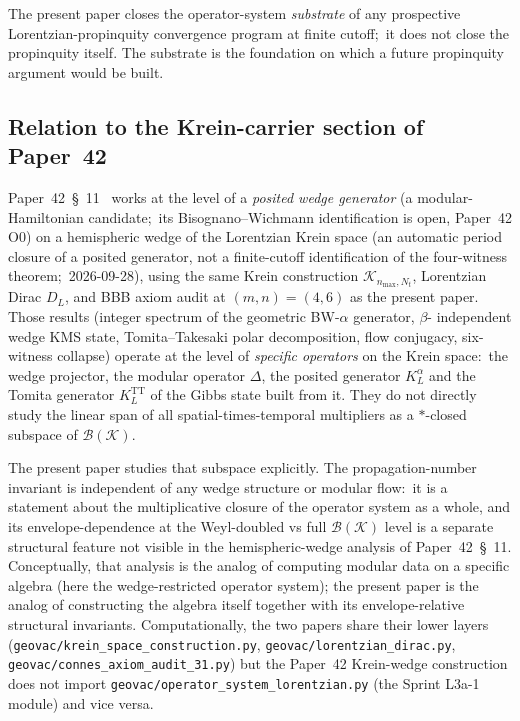 \documentclass[11pt,a4paper]{article}
\theoremstyle{plain}
\theoremstyle{definition}
\newcommand{\nmax}{n_{\max}}
\newcommand{\Nt}{N_t}
\newcommand{\Krein}{\mathcal{K}}
\newcommand{\Bcal}{\mathcal{B}}
\newcommand{\DL}{D_L}
\newcommand{\TT}{\mathrm{TT}}
\begin{document}
The present paper closes the operator-system \emph{substrate} of any
prospective Lorentzian-propinquity convergence program at finite
cutoff;\ it does not close the propinquity itself. The substrate is the
foundation on which a future propinquity argument would be built.

\subsection{Relation to the Krein-carrier section of Paper~42}

Paper~42~\S~11~\cite{paper42} works at the level of a \emph{posited
wedge generator} (a modular-Hamiltonian candidate;\ its
Bisognano--Wichmann identification is open, Paper~42 O0)
on a hemispheric wedge of the Lorentzian Krein space (an automatic
period closure of a posited generator, not a finite-cutoff
identification of the four-witness theorem;\ 2026-09-28), using the
same Krein construction
$\Krein_{\nmax, \Nt}$, Lorentzian Dirac $\DL$, and BBB axiom audit at
$(m, n) = (4, 6)$ as the present paper. Those results
(integer spectrum of the geometric BW-$\alpha$ generator, $\beta$-%
independent wedge KMS state, Tomita--Takesaki polar decomposition,
flow conjugacy, six-witness collapse) operate at the level of
\emph{specific operators} on the Krein space:\ the wedge projector,
the modular operator $\Delta$, the posited generator $K_L^\alpha$
and the Tomita generator $K_L^{\TT}$ of the Gibbs state built from it. They do not directly study the linear span of all
spatial-times-temporal multipliers as a $*$-closed subspace of
$\Bcal(\Krein)$.

The present paper studies that subspace explicitly. The
propagation-number invariant is independent of any wedge structure or
modular flow:\ it is a statement about the multiplicative closure of
the operator system as a whole, and its envelope-dependence at the
Weyl-doubled vs full $\Bcal(\Krein)$ level is a separate structural
feature not visible in the hemispheric-wedge analysis of Paper~42~\S~11.
Conceptually, that analysis is the analog of computing modular data on a
specific algebra (here the wedge-restricted operator system); the
present paper is the analog of constructing the algebra itself
together with its envelope-relative structural invariants.
Computationally, the two papers share their lower layers
(\texttt{geovac/krein\_space\_construction.py},
\texttt{geovac/lorentzian\_dirac.py},
\texttt{geovac/connes\_axiom\_audit\_31.py}) but the Paper~42 Krein-wedge construction does not
import \texttt{geovac/operator\_system\_lorentzian.py} (the Sprint
L3a-1 module) and vice versa.
\end{document}
